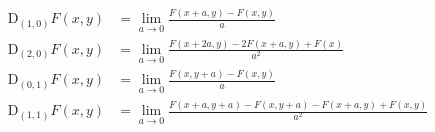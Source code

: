 \begin{equation*}
\begin{aligned}
\mathrm{D}_{(1,0)} F(x, y) &=
\lim_{a \to 0}{\frac{
  F(x + a, y)
- F(x, y)
}{a}}
\\
\mathrm{D}_{(2,0)} F(x, y) &=
\lim_{a \to 0}{\frac{
  F(x + 2 a, y)
- 2 F(x + a, y)
+ F(x)
}{a^2}}
\\
\mathrm{D}_{(0,1)} F(x, y) &=
\lim_{a \to 0}{\frac{
  F(x, y + a)
- F(x, y)
}{a}}
\\
\mathrm{D}_{(1,1)} F(x, y) &=
\lim_{a \to 0}{\frac{{
  F(x + a, y + a)
- F(x, y + a)
- F(x + a, y)
+ F(x, y)
}}{a^2}}
\\
\end{aligned}
\end{equation*}
